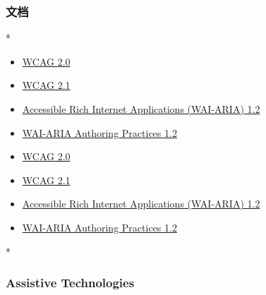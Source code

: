 \begin{paracol}{2}
\subsubsection{文档}
\switchcolumn[0]*%
\begin{itemize}
\item
  \href{https://www.w3.org/TR/WCAG20/}{WCAG 2.0}
\item
  \href{https://www.w3.org/TR/WCAG21/}{WCAG 2.1}
\item
  \href{https://www.w3.org/TR/wai-aria-1.2/}{Accessible Rich Internet
  Applications (WAI-ARIA) 1.2}
\item
  \href{https://www.w3.org/TR/wai-aria-practices-1.2/}{WAI-ARIA
  Authoring Practices 1.2}
\end{itemize}
\switchcolumn
\begin{itemize}
\item
  \href{https://www.w3.org/TR/WCAG20/}{WCAG 2.0}
\item
  \href{https://www.w3.org/TR/WCAG21/}{WCAG 2.1}
\item
  \href{https://www.w3.org/TR/wai-aria-1.2/}{Accessible Rich Internet
  Applications (WAI-ARIA) 1.2}
\item
  \href{https://www.w3.org/TR/wai-aria-practices-1.2/}{WAI-ARIA
  Authoring Practices 1.2}
\end{itemize}
\switchcolumn[0]*%
\subsubsection{Assistive Technologies}
\switchcolumn

\end{paracol}
